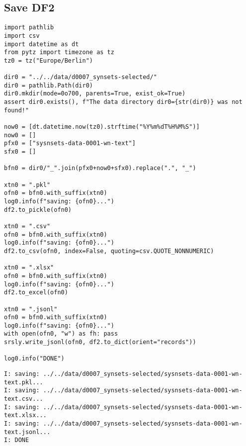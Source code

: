 \documentclass[a4paper,10pt,onecolumn,oneside,openright]{article}
\begin{document}
\subsection{Save DF2}
\label{sec:org6eec026}
\begin{verbatim}
import pathlib
import csv
import datetime as dt
from pytz import timezone as tz
tz0 = tz("Europe/Berlin")

dir0 = "../../data/d0007_synsets-selected/"
dir0 = pathlib.Path(dir0)
dir0.mkdir(mode=0o700, parents=True, exist_ok=True)
assert dir0.exists(), f"The data directory dir0={str(dir0)} was not found!"

now0 = [dt.datetime.now(tz0).strftime("%Y%m%dT%H%M%S")]
now0 = []
pfx0 = ["sysnsets-data-0001-wn-text"]
sfx0 = []

bfn0 = dir0/"_".join(pfx0+now0+sfx0).replace(".", "_")

xtn0 = ".pkl"
ofn0 = bfn0.with_suffix(xtn0)
log0.info(f"saving: {ofn0}...")
df2.to_pickle(ofn0)

xtn0 = ".csv"
ofn0 = bfn0.with_suffix(xtn0)
log0.info(f"saving: {ofn0}...")
df2.to_csv(ofn0, index=False, quoting=csv.QUOTE_NONNUMERIC)

xtn0 = ".xlsx"
ofn0 = bfn0.with_suffix(xtn0)
log0.info(f"saving: {ofn0}...")
df2.to_excel(ofn0)

xtn0 = ".jsonl"
ofn0 = bfn0.with_suffix(xtn0)
log0.info(f"saving: {ofn0}...")
with open(ofn0, "w") as fh: pass
srsly.write_jsonl(ofn0, df2.to_dict(orient="records"))

log0.info("DONE")
\end{verbatim}

\begin{verbatim}
I: saving: ../../data/d0007_synsets-selected/sysnsets-data-0001-wn-text.pkl...
I: saving: ../../data/d0007_synsets-selected/sysnsets-data-0001-wn-text.csv...
I: saving: ../../data/d0007_synsets-selected/sysnsets-data-0001-wn-text.xlsx...
I: saving: ../../data/d0007_synsets-selected/sysnsets-data-0001-wn-text.jsonl...
I: DONE
\end{verbatim}
\end{document}
